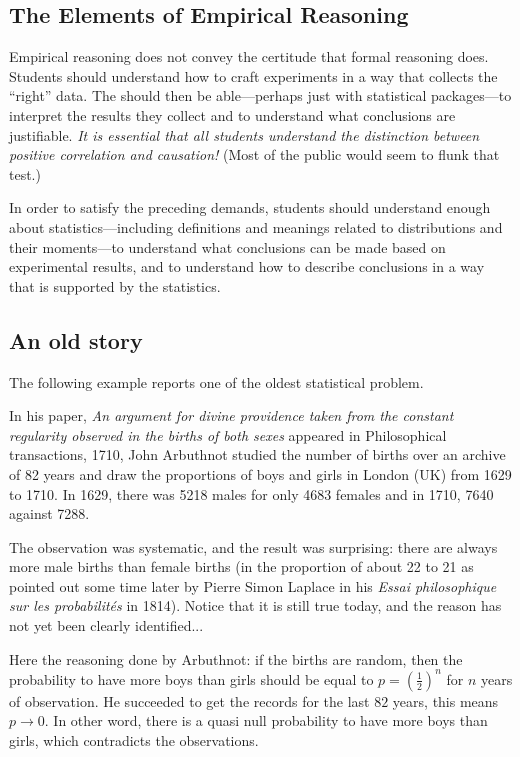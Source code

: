 \subsection{The Elements of Empirical Reasoning}

Empirical reasoning does not convey the certitude that formal
reasoning does.  Students should understand how to craft experiments
in a way that collects the ``right'' data.  The should then be
able---perhaps just with statistical packages---to interpret the
results they collect and to understand what conclusions are
justifiable.  {\em It is essential that all students understand the                  
  distinction between {\em positive correlation} and {\em causation}!}
(Most of the public would seem to flunk that test.)

In order to satisfy the preceding demands, students should understand
enough about statistics---including definitions and meanings related
to distributions and their moments---to understand what conclusions
can be made based on experimental results, and to understand how to
describe conclusions in a way that is supported by the statistics.


\subsection{An old story}

The following example reports one of the oldest statistical problem.

In his paper,
\textit{An argument for divine providence taken from the constant regularity observed in the births of both sexes}
appeared in Philosophical transactions, 1710, 
John Arbuthnot studied the number of births over an archive of 82 years and draw the proportions of boys and girls
in London (UK) from 1629 to 1710. 
In 1629, there was  5218 males for only 4683 females and in 1710, 7640 against 7288. 
 
The observation was systematic, and the result was surprising: there are always more male births than female births
(in the proportion of about 22 to 21 as pointed out some time later by Pierre Simon Laplace in his 
\textit{Essai philosophique sur les probabilités} in 1814). 
Notice that it is still true today, and the reason has not yet been clearly identified...

Here the reasoning done by Arbuthnot:
if the births are random, then the probability to have more boys than girls should be equal to 
$p=(\frac{1}{2})^{n}$ for $n$ years of observation.
He succeeded to get the records for the last $82$ years, this means $p \rightarrow 0$.
In other word, there is a quasi null probability to have more boys than girls, which contradicts the observations. 

